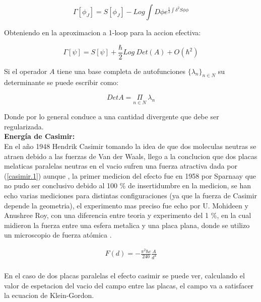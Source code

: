 \begin{equation}
\Gamma [\phi _J ] = S [ \phi _J ] - Log \int D \phi e ^{\frac{1}{2} \int \delta ^2 S \phi \phi }
\end{equation}


Obteniendo en la aproximacion a 1-loop para la accion efectiva:

\begin{equation}
\Gamma [\psi] = S [\psi] + \frac{\hbar}{2} Log \ Det (A) +
O ( \hbar ^2 )
\end{equation}


Si el operador $A$ tiene una base completa de autofunciones $ \{ \lambda _n \} _{n \in N}$ su determinante se puede escribir como:

\begin{equation}
Det A = \underset{ n \in N }{ \Pi } \ \lambda _n
\end{equation}

Donde por lo general conduce a una cantidad divergente que debe ser regularizada.\\



\textbf{Energía de Casimir:} \\ 

En el año 1948 Hendrik Casimir tomando la idea de que dos moleculas neutras se atraen debido a las fuerzas de Van der Waals, llego a la conclucion que dos placas melaticas paralelas neutras en el vacio sufren una fuerza atractiva dada por (\ref{casimir.1}) aunque , la primer medicion del efecto fue en 1958 por Sparnaay que no pudo ser conclusivo debido al 100 \% de insertidumbre en la medicion, se han echo varias mediciones para distintas configuraciones (ya que la fuerza de Casimir depende la geometria), el experimento mas preciso fue echo por U. Mohideen y Anushree Roy, con una diferencia entre teoria y experimento del 1 \%, en la cual midieron la fuerza entre una esfera metalica y una placa plana, donde se utilizo un microscopio de fuerza atómica \cite{BORDAG20011} .


\begin{equation}
\begin{array}{c}
F(d) = - \frac{\pi ^2 \hbar c}{240} \frac{A}{d^4} \\
\end{array} 
\label{casimir.1}
\end{equation}




En el caso de dos placas paralelas el efecto casimir se puede ver, calculando el valor de espetacion del vacio del campo entre las placas, el campo va a satisfacer la ecuacion de Klein-Gordon.

